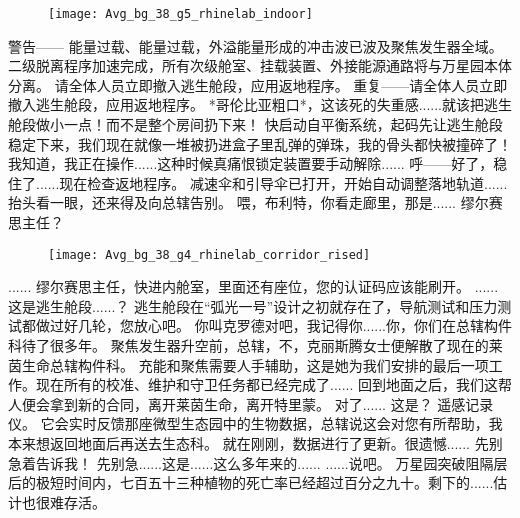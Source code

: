 \documentclass[openany]{book}
\begin{document}
\begin{figure}[h]
    \centering
    \texttt{[image: Avg\_bg\_38\_g5\_rhinelab\_indoor]}
\end{figure}
\begin{dialogue}
     警告——
     能量过载、能量过载，外溢能量形成的冲击波已波及聚焦发生器全域。
     二级脱离程序加速完成，所有次级舱室、挂载装置、外接能源通路将与万星园本体分离。
     请全体人员立即撤入逃生舱段，应用返地程序。
     重复——请全体人员立即撤入逃生舱段，应用返地程序。
     *哥伦比亚粗口*，这该死的失重感......就该把逃生舱段做小一点！而不是整个房间扔下来！
     快启动自平衡系统，起码先让逃生舱段稳定下来，我们现在就像一堆被扔进盒子里乱弹的弹珠，我的骨头都快被撞碎了！
     我知道，我正在操作......这种时候真痛恨锁定装置要手动解除......
     呼——好了，稳住了......现在检查返地程序。
     减速伞和引导伞已打开，开始自动调整落地轨道......抬头看一眼，还来得及向总辖告别。
     喂，布利特，你看走廊里，那是......
     缪尔赛思主任？
    \begin{figure}[h]
        \centering
        \texttt{[image: Avg\_bg\_38\_g4\_rhinelab\_corridor\_rised]}
    \end{figure}
     ......
     缪尔赛思主任，快进内舱室，里面还有座位，您的认证码应该能刷开。
     ......
     这是逃生舱段......？
     逃生舱段在“弧光一号”设计之初就存在了，导航测试和压力测试都做过好几轮，您放心吧。
     你叫克罗德对吧，我记得你......你，你们在总辖构件科待了很多年。
     聚焦发生器升空前，总辖，不，克丽斯腾女士便解散了现在的莱茵生命总辖构件科。
     充能和聚焦需要人手辅助，这是她为我们安排的最后一项工作。现在所有的校准、维护和守卫任务都已经完成了......
     回到地面之后，我们这帮人便会拿到新的合同，离开莱茵生命，离开特里蒙。
     对了......
     这是？
     遥感记录仪。
     它会实时反馈那座微型生态园中的生物数据，总辖说这会对您有所帮助，我本来想返回地面后再送去生态科。
     就在刚刚，数据进行了更新。很遗憾......
     先别急着告诉我！
     先别急......这是......这么多年来的......
     ......说吧。
     万星园突破阻隔层后的极短时间内，七百五十三种植物的死亡率已经超过百分之九十。剩下的......估计也很难存活。

\end{dialogue}
\end{document}
